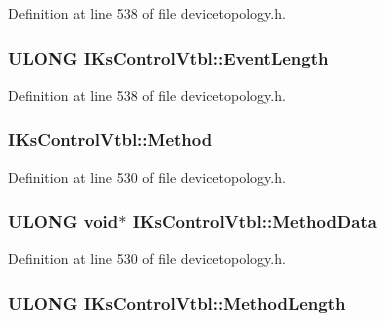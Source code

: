 Definition at line 538 of file devicetopology.\+h.

\subsubsection[{\texorpdfstring{Event\+Length}{EventLength}}]{ {\bf U\+L\+O\+NG} I\+Ks\+Control\+Vtbl\+::\+Event\+Length}\hypertarget{struct_i_ks_control_vtbl_a0aec59a230562c8f84cd81b29854b0e3}{}\label{struct_i_ks_control_vtbl_a0aec59a230562c8f84cd81b29854b0e3}


Definition at line 538 of file devicetopology.\+h.

\subsubsection[{\texorpdfstring{Method}{Method}}]{ I\+Ks\+Control\+Vtbl\+::\+Method}\hypertarget{struct_i_ks_control_vtbl_ad9a4560e5712f67388d833b66462d6da}{}\label{struct_i_ks_control_vtbl_ad9a4560e5712f67388d833b66462d6da}


Definition at line 530 of file devicetopology.\+h.

\subsubsection[{\texorpdfstring{Method\+Data}{MethodData}}]{ {\bf U\+L\+O\+NG} {\bf void}$\ast$ I\+Ks\+Control\+Vtbl\+::\+Method\+Data}\hypertarget{struct_i_ks_control_vtbl_ab3b3e2a42b36386dadbbf1790d28dcf7}{}\label{struct_i_ks_control_vtbl_ab3b3e2a42b36386dadbbf1790d28dcf7}


Definition at line 530 of file devicetopology.\+h.

\subsubsection[{\texorpdfstring{Method\+Length}{MethodLength}}]{ {\bf U\+L\+O\+NG} I\+Ks\+Control\+Vtbl\+::\+Method\+Length}\hypertarget{struct_i_ks_control_vtbl_a68ab364be0c53d28a069edd628adfe06}{}\label{struct_i_ks_control_vtbl_a68ab364be0c53d28a069edd628adfe06}



